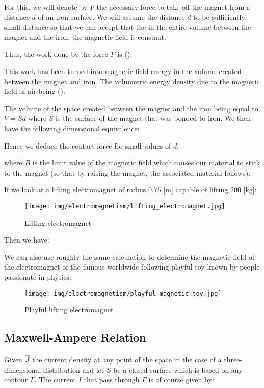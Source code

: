 	For this, we will denote by $F$ the necessary force to take off the magnet from a distance $d$ of an iron surface. We will assume the distance $d$ to be sufficiently small distance so that we can accept that the in the entire volume between the magnet and the iron, the magnetic field is constant.
	
	Thus, the work done by the force $F$ is ():
	
	This work has been turned into magnetic field energy in the volume created between the magnet and iron. The volumetric energy density due to the magnetic field of air being ():
	
	The volume of the space created between the magnet and the iron being equal to $V=Sd$ where $S$ is the surface of the magnet that was bonded to iron. We then have the following dimensional equivalence:
	
	Hence we deduce the contact force for small values of $d$:
	
	where $B$ is the limit value of the magnetic field which causes our material to stick to the magnet (so that by raising the magnet, the associated material follows).
	
	If we look at a lifting electromagnet of radius $0.75$ [m] capable of lifting $200$ [kg]:
	\begin{figure}[H]
		\centering
		\texttt{[image: img/electromagnetism/lifting\_electromagnet.jpg]}
		\caption{Lifting electromagnet}
	\end{figure}
	Then we have:
	
	We can also use roughly the same calculation to determine the magnetic field of the electromagnet of the famous worldwide following playful toy known by people passionate in physics:
	\begin{figure}[H]
		\centering
		\texttt{[image: img/electromagnetism/playful\_magnetic\_toy.jpg]}
		\caption{Playful lifting electromagnet}
	\end{figure}
	
	\pagebreak
	\subsection{Maxwell-Ampere Relation}
	Given $\vec{J}$ the current density at any point of the space in the case of a three-dimensional distribution and let $S$ be a closed surface which is based on any contour $\Gamma$. The current $I$ that pass through $\Gamma$ is of course given by:
	
